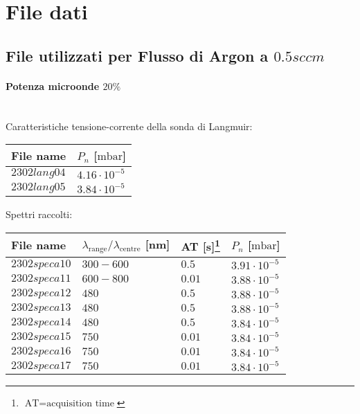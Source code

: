 \section{File dati}
\subsection{File utilizzati per Flusso di Argon a $0.5sccm$}

\paragraph*{Potenza microonde $\text{20\%}$} ~\\
Caratteristiche tensione-corrente della sonda di Langmuir:
\begin{center}
\begin{tabular}{p{3cm}p{3cm}}
\toprule
File name	&$P_{n}$ [$\si{\milli\bar}$]\\
\midrule
$2302lang04$	&$4.16\cdot10^{-5}$\\
$2302lang05$	&$3.84\cdot10^{-5}$\\
\bottomrule
\end{tabular}
\end{center}

Spettri raccolti:
\begin{center}
\begin{tabular}{p{3cm}p{4cm}p{2cm}p{3cm}}
\toprule
File name	&$\lambda_\text{range}\text{/}\lambda_\text{centre}$ [nm] &AT [s]\footnote{$\text{AT}=\text{acquisition time}$} &$P_{n}$ [$\si{\milli\bar}$]\\
\midrule
$2302speca10$	&$300-600$	&$0.5$		&$3.91\cdot10^{-5}$\\
$2302speca11$	&$600-800$	&$0.01$		&$3.88\cdot10^{-5}$\\
$2302speca12$	&$480$		&$0.5$		&$3.88\cdot10^{-5}$\\
$2302speca13$	&$480$		&$0.5$		&$3.88\cdot10^{-5}$\\
$2302speca14$	&$480$		&$0.5$		&$3.84\cdot10^{-5}$\\
$2302speca15$	&$750$		&$0.01$		&$3.84\cdot10^{-5}$\\
$2302speca16$	&$750$		&$0.01$		&$3.84\cdot10^{-5}$\\
$2302speca17$	&$750$		&$0.01$		&$3.84\cdot10^{-5}$\\
\bottomrule
\end{tabular}
\end{center}

